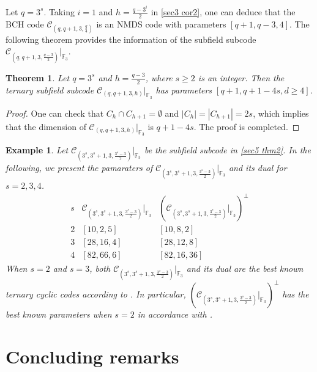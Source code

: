 \documentclass[sn-mathphys-num]{sn-jnl}%
\theoremstyle{thmstyleone}%
\newtheorem{theorem}{Theorem}%
\theoremstyle{thmstyletwo}%
\newtheorem{example}{Example}%
\theoremstyle{thmstylethree}%
\begin{document}
Let $q=3^s$. Taking $i=1$ and $h=\frac{q-3^i}{2}$ in \cref{sec3 cor2}, one can deduce that the BCH code $\mathcal{C}_{(q,q+1,3,\frac{q}{4})}$ is an NMDS code with parameters $[q+1,q-3,4]$. The following theorem provides the information of the subfield subcode $\mathcal{C}_{(q,q+1,3,\frac{q-3}{2})}|_{\mathbb{F}_{3}}$. 

\begin{theorem}\label{sec5 thm3}
	Let $q=3^s$ and $h=\frac{q-3}{2}$, where $s\ge 2$ is an integer. Then the ternary subfield subcode $\mathcal{C}_{(q,q+1,3,h)}|_{\mathbb{F}_{3}}$ has parameters $[q+1,q+1-4s,d\ge4]$.
\end{theorem}
\begin{proof}
	One can check that $C_h \cap C_{h+1} =\emptyset$ and $|C_h|=|C_{h+1}|=2s$, which implies that the dimension of $\mathcal{C}_{(q,q+1,3,h)}|_{\mathbb{F}_{3}}$ is $q+1-4s$. The proof is completed.
\end{proof}

\begin{example}
	Let $\mathcal{C}_{(3^s,3^s+1,3,\frac{3^s-3}{2})}|_{\mathbb{F}_3}$ be the subfield subcode in \cref{sec5 thm2}. In the following, we present the pamaraters of $\mathcal{C}_{(3^s,3^s+1,3,\frac{3^s-3}{2})}|_{\mathbb{F}_3}$ and its dual for $s=2,3,4$.
	\begin{equation*}
		\begin{array}{ccc}
			s&\mathcal{C}_{(3^s,3^s+1,3,\frac{3^s-3}{2})}|_{\mathbb{F}_3}&(\mathcal{C}_{(3^s,3^s+1,3,\frac{3^s-3}{2})}|_{\mathbb{F}_3})^\perp\\2&[10,2,5]&[10,8,2]\\3&[28,16,4]&[28,12,8]\\4&[82,66,6]&[82,16,36]
		\end{array}
	\end{equation*}
	When $s = 2$ and $s = 3$, both $\mathcal{C}_{(3^s,3^s+1,3,\frac{3^s-3}{2})}|_{\mathbb{F}_3}$ and its dual are the best known ternary cyclic codes according to \cite[Appendix A]{Ding2014CodesDifferenceSetsa}. In particular, $(\mathcal{C}_{(3^s,3^s+1,3,\frac{3^s-3}{2})}|_{\mathbb{F}_3})^\perp$ has the best known parameters when $s=2$ in accordance with \cite{Grassl}.
\end{example}

\section{Concluding remarks}\label{sec6}
\end{document}
